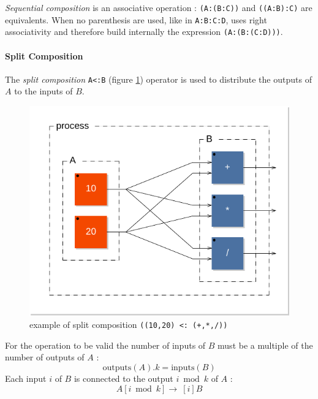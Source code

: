 \emph{Sequential composition} is an associative operation : \lstinline$(A:(B:C))$ and \lstinline$((A:B):C)$ are equivalents. When no parenthesis are used, like in \lstinline$A:B:C:D$, \faust uses right associativity and therefore build internally the expression \lstinline$(A:(B:(C:D)))$.

\paragraph{Split Composition}
The \emph{split composition}  \lstinline$A<:B$ (figure \ref{figure-split1}) operator is used to distribute the outputs
of $A$ to the inputs of $B$.

\begin{figure}[h]
\centering 
\includegraphics[scale=0.7]{images/split1} 
\caption{example of split composition   \lstinline'((10,20) <: (+,*,/))'}  
\label{figure-split1}
\end{figure}

For the operation to be valid the number of inputs of $B$ must be a multiple of the number of outputs of $A$ : \begin{equation}
\mathrm{outputs}(A).k=\mathrm{inputs}(B)                                                                                                                                                         \end{equation}
Each input $i$ of $B$ is connected to the output $i \bmod k$ of $A$ : 
\begin{equation}
A[i \bmod k]\rightarrow\ [i]B                                                                                                                                                                                                                                                                                                                       \end{equation}


